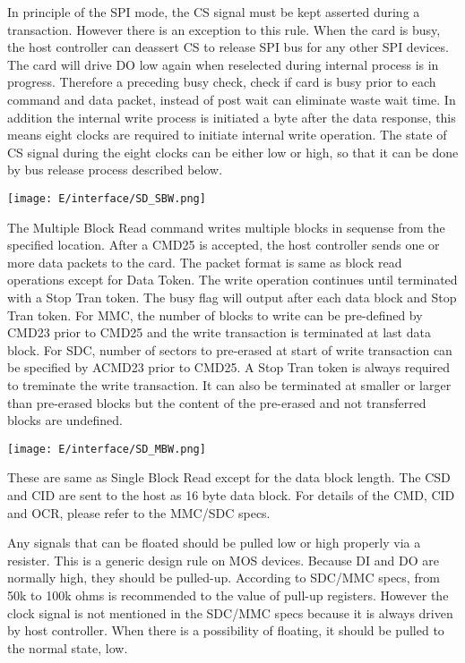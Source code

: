 In principle of the SPI mode, the CS signal must be kept asserted during a
transaction. However there is an exception to this rule. When the card is busy,
the host controller can deassert CS to release SPI bus for any other SPI
devices. The card will drive DO low again when reselected during internal
process is in progress. Therefore a preceding busy check, check if card is busy
prior to each command and data packet, instead of post wait can eliminate waste
wait time. In addition the internal write process is initiated a byte after the
data response, this means eight clocks are required to initiate internal write
operation. The state of CS signal during the eight clocks can be either low or
high, so that it can be done by bus release process described below.

\bigskip
\noindent\texttt{[image: E/interface/SD\_SBW.png]}
\bigskip


The Multiple Block Read command writes multiple blocks in sequense from the
specified location. After a CMD25 is accepted, the host controller sends one or
more data packets to the card. The packet format is same as block read
operations except for Data Token. The write operation continues until terminated
with a Stop Tran token. The busy flag will output after each data block and Stop
Tran token. For MMC, the number of blocks to write can be pre-defined by CMD23
prior to CMD25 and the write transaction is terminated at last data block. For
SDC, number of sectors to pre-erased at start of write transaction can be
specified by ACMD23 prior to CMD25. A Stop Tran token is always required to
treminate the write transaction. It can also be terminated at smaller or larger
than pre-erased blocks but the content of the pre-erased and not transferred
blocks are undefined.

\bigskip
\noindent\texttt{[image: E/interface/SD\_MBW.png]}
\bigskip


These are same as Single Block Read except for the data block length. The CSD
and CID are sent to the host as 16 byte data block. For details of the CMD, CID
and OCR, please refer to the MMC/SDC specs.

\secup


Any signals that can be floated should be pulled low or high properly via a
resister. This is a generic design rule on MOS devices. Because DI and DO are
normally high, they should be pulled-up. According to SDC/MMC specs, from 50k to
100k ohms is recommended to the value of pull-up registers. However the clock
signal is not mentioned in the SDC/MMC specs because it is always driven by host
controller. When there is a possibility of floating, it should be pulled to the
normal state, low.

